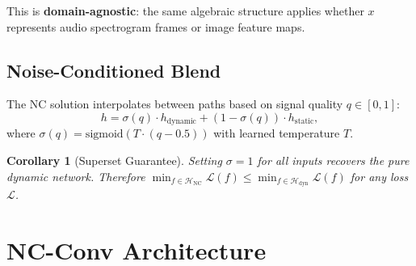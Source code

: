 \documentclass[10pt,twocolumn,letterpaper]{article}
\newtheorem{corollary}{Corollary}
\begin{document}
This is \textbf{domain-agnostic}: the same algebraic structure applies whether $x$ represents audio spectrogram frames or image feature maps.

\subsection{Noise-Conditioned Blend}

The NC solution interpolates between paths based on signal quality $q \in [0, 1]$:
\begin{equation}
h = \sigma(q) \cdot h_{\text{dynamic}} + (1 - \sigma(q)) \cdot h_{\text{static}},
\label{eq:nc_blend}
\end{equation}
where $\sigma(q) = \text{sigmoid}(T \cdot (q - 0.5))$ with learned temperature $T$.

\begin{corollary}[Superset Guarantee]
\label{cor:superset}
Setting $\sigma = 1$ for all inputs recovers the pure dynamic network.
Therefore $\min_{f \in \mathcal{H}_{\text{NC}}} \mathcal{L}(f) \leq \min_{f \in \mathcal{H}_{\text{dyn}}} \mathcal{L}(f)$ for any loss $\mathcal{L}$.
\end{corollary}


\section{NC-Conv Architecture}
\label{sec:ncconv}
\end{document}
